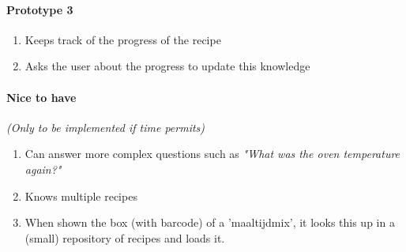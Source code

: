 \documentclass[11pt]{article} %
\begin{document}
\paragraph{Prototype 3}
\begin{enumerate}
\item Keeps track of the progress of the recipe
\item Asks the user about the progress to update this knowledge

\end{enumerate}


\paragraph{Nice to have}
\emph{(Only to be implemented if time permits)}

\begin{enumerate}
\item Can answer more complex questions such as \emph{"What was the oven temperature again?"}
\item Knows multiple recipes
\item When shown the box (with barcode) of a 'maaltijdmix', it looks this up in a (small) repository of recipes and loads it.

\end{enumerate}
\end{document}
